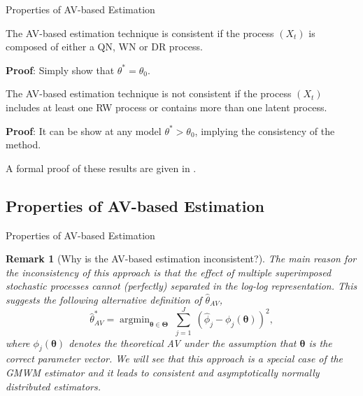 \documentclass[envcountsect,usenames,dvipsnames]{beamer}
\DeclareMathOperator*{\argmin}{argmin}
\def\btheta{\bm \theta}
\def\bTheta{\bm \Theta}
\theoremstyle{mystyle}
\newtheorem{Remark}{Remark}
\begin{document}
\begin{frame}{Properties of AV-based Estimation}

    \begin{Corollary}
    The AV-based estimation technique is consistent if the process $(X_t)$ is composed of either a QN, WN or DR process.
    \end{Corollary}
    
    \vspace{0.25cm}
    \textbf{Proof}: Simply show that $\theta^* = \theta_0$.
    
    \begin{Corollary}
    The AV-based estimation technique is not consistent if the process $(X_t)$ includes at least one RW process or contains more than one latent process.
    \end{Corollary}
    
    \vspace{0.25cm}
    \textbf{Proof}: It can be show at any model $\theta^* > \theta_0$, implying the consistency of the method.
    
    \vspace{0.25cm}
    A formal proof of these results are given in \cite{guerrier2016theoretical}.
    
\end{frame}

\subsection{Properties of AV-based Estimation}

\begin{frame}{Properties of AV-based Estimation}

    \begin{Remark}[Why is the AV-based estimation inconsistent?]
    The main reason for the inconsistency of this approach is that the effect of multiple superimposed stochastic processes cannot (perfectly) separated in the log-log representation. This suggests the following alternative definition of $\hat{\theta}_{AV}$,
    \begin{equation*}
        \hat{\theta}_{AV}^* = \argmin_{\btheta \in \bTheta} \; \sum_{j = 1}^J \; \left( \hat{\phi}_j - \phi_j (\bm{\theta})\right)^2,
    \end{equation*}
    where $\phi_j (\bm{\theta})$ denotes the theoretical AV under the assumption that $\btheta$ is the correct parameter vector. We will see that this approach  is a special case of the GMWM estimator and it leads to consistent and asymptotically normally distributed estimators.
    \end{Remark}
    
\end{frame}
\end{document}
